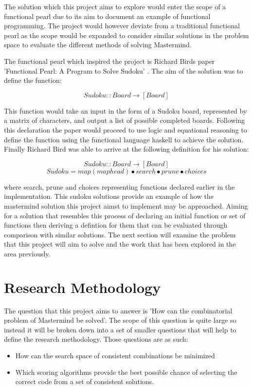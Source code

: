 \documentclass[12pt]{article}  %
\theoremstyle{definition}
\theoremstyle{remark}
\begin{document}
The solution which this project aims to explore would enter the scope of a functional pearl due to its aim to document an example of functional programming. The project would however deviate from a traditional functional pearl as the scope would be expanded to consider similar solutions in the problem space to evaluate the different methods of solving Mastermind.

The functional pearl which inspired the project is Richard Birds paper 'Functional Pearl: A Program to Solve Sudoku' \cite{Sudoku}. The aim of the solution was to define the function:

\[ Sudoku :: Board \rightarrow [Board]\]

This function would take an input in the form of a Sudoku board, represented by a matrix of characters, and output a list of possible completed boards. Following this declaration the paper would proceed to use logic and equational reasoning to define the function using the functional language haskell to achieve the solution. Finally Richard Bird was able to arrive at the following definition for his solution:

\[ Sudoku :: Board \rightarrow [Board]\]
\[ Sudoku = map (map head) \bullet search \bullet prune \bullet choices\]

where search, prune and choices representing functions declared earlier in the implementation. This sudoku solutions provide an example of how the mastermind solution this project aimst to implement may be approached. Aiming for a solution that resembles this process of declaring an initial function or set of functions then deriving a defintion for them that can be evaluated through comparison with similar solutions. The next section will examine the problem that this project will aim to solve and the work that has been explored in the area previously.

\newpage                     %
\section{Research Methodology}\label{ss:back}

The question that this project aims to answer is 'How can the combinatorial problem of Mastermind be solved'. The scope of this question is quite large so instead it will be broken down into a set of smaller questions that will help to define the research methodology. Those questions are as such:

\begin {itemize}
	\item {How can the search space of consistent combinations be minimized}
	\item {Which scoring algorithms provide the best possible chance of selecting the correct code from a set of consistent solutions.}
\end {itemize}
\end{document}
